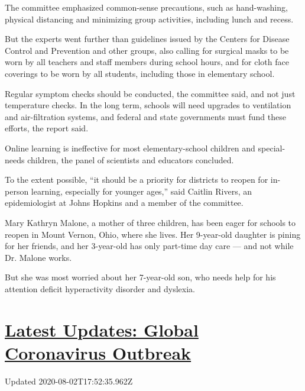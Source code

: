 The committee emphasized common-sense precautions, such as hand-washing,
physical distancing and minimizing group activities, including lunch and
recess.

But the experts went further than guidelines issued by the Centers for
Disease Control and Prevention and other groups, also calling for
surgical masks to be worn by all teachers and staff members during
school hours, and for cloth face coverings to be worn by all students,
including those in elementary school.

Regular symptom checks should be conducted, the committee said, and not
just temperature checks. In the long term, schools will need upgrades to
ventilation and air-filtration systems, and federal and state
governments must fund these efforts, the report said.

Online learning is ineffective for most elementary-school children and
special-needs children, the panel of scientists and educators concluded.

To the extent possible, ``it should be a priority for districts to
reopen for in-person learning, especially for younger ages,'' said
Caitlin Rivers, an epidemiologist at Johns Hopkins and a member of the
committee.

Mary Kathryn Malone, a mother of three children, has been eager for
schools to reopen in Mount Vernon, Ohio, where she lives. Her 9-year-old
daughter is pining for her friends, and her 3-year-old has only
part-time day care --- and not while Dr. Malone works.

But she was most worried about her 7-year-old son, who needs help for
his attention deficit hyperactivity disorder and dyslexia.

\hypertarget{latest-updates-global-coronavirus-outbreak}{%
\section{\texorpdfstring{\href{https://www.nytimes.com/2020/08/01/world/coronavirus-covid-19.html?action=click\&pgtype=Article\&state=default\&region=MAIN_CONTENT_1\&context=storylines_live_updates}{Latest
Updates: Global Coronavirus
Outbreak}}{Latest Updates: Global Coronavirus Outbreak}}\label{latest-updates-global-coronavirus-outbreak}}

Updated 2020-08-02T17:52:35.962Z

